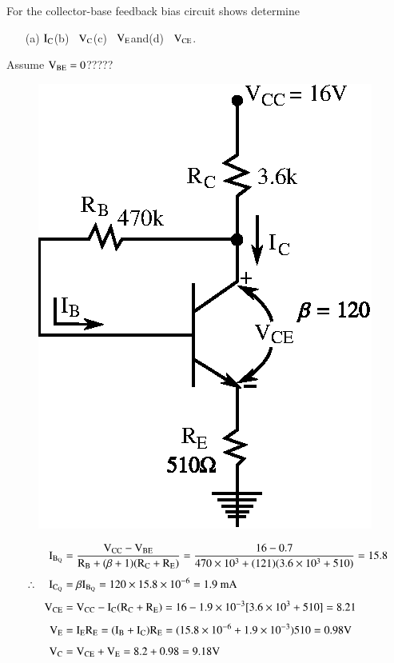 \begin{problem}\label{prob3.7}
For the collector-base feedback bias circuit shows determine
\begin{itemize}
\item[(a)] $\textrm{I}_{\textrm{C}}$\quad (b)~ $\textrm{V}_{\textrm{C}}$\quad (c)~ $\textrm{V}_{\textrm{E}}$\quad and\quad (d)~ $\textrm{V}_{\text{CE}}$.
\end{itemize}
Assume $\textrm{V}_{\text{BE}}=0$?????
\begin{figure}[H]
\centering
\includegraphics[scale=.87]{chap3/fig3.16.eps}
\end{figure}
\end{problem}

\begin{solution}
\begin{align*}
\textrm{I}_{\textrm{B}_{\textrm{Q}}} &= \frac{\textrm{V}_{\text{CC}}-\textrm{V}_{\text{BE}}}{\textrm{R}_{\textrm{B}}+(\beta+1)(\textrm{R}_{\textrm{C}}+\textrm{R}_{\textrm{E}})}=\frac{16-0.7}{470\times 10^{3}+(121)(3.6\times 10^{3}+510)}=15.8\\[4pt]
\therefore\quad \textrm{I}_{\textrm{C}_{\textrm{Q}}} &= \beta \textrm{I}_{\textrm{B}_{\textrm{Q}}}=120\times 15.8\times 10^{-6}=1.9\text{~mA}\\[4pt]
\textrm{V}_{\text{CE}} &= \textrm{V}_{\text{CC}}-\textrm{I}_{\textrm{C}}(\textrm{R}_{\textrm{C}}+\textrm{R}_{\textrm{E}})=16-1.9\times 10^{-3}[3.6\times 10^{3}+510]=8.21\\[4pt]
\textrm{V}_{\textrm{E}} &= \textrm{I}_{\textrm{E}}\textrm{R}_{\textrm{E}}=(\textrm{I}_{\textrm{B}}+\textrm{I}_{\textrm{C}})\textrm{R}_{\textrm{E}}=(15.8\times 10^{-6}+1.9\times 10^{-3})510=0.98\textrm{V}\\[4pt]
\textrm{V}_{\textrm{C}} &= \textrm{V}_{\text{CE}}+\textrm{V}_{\textrm{E}}=8.2+0.98=9.18\textrm{V}
\end{align*}
\end{solution}

